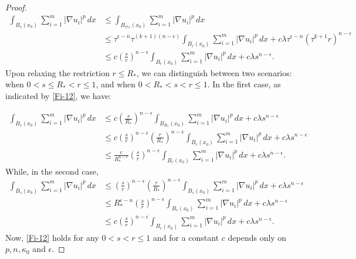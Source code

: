 \documentclass{amsart}
\begin{document}
\begin{proof}
\begin{align} \nonumber
\int_{B_s(x_0)} \sum_{i=1}^{m} |\nabla u_i|^p \, dx  & \leq \int_{B_{\tau^k r}(x_0)} \sum_{i=1}^{m} |\nabla u_i|^p \, dx \\ \nonumber
& \leq \tau^{\epsilon-n} \tau^{(k+1)(n-\epsilon)} \int_{B_{r}(x_0)} \sum_{i=1}^{m} |\nabla u_i|^p \, dx + c \lambda \tau^{\epsilon-n} \left(\tau^{k+1} r \right)^{n-\epsilon} \\ \label{Fi-12}
& \leq c \left( \frac{s}{r} \right)^{n-\epsilon} \int_{B_{r}(x_0)} \sum_{i=1}^{m} |\nabla u_i|^p \, dx + c \lambda s^{n-\epsilon}.
\end{align}
Upon relaxing the restriction $r \leq R_*$, we can distinguish between two scenarios: 
when $0 < s \leq R_* < r \leq 1$, and when 
$0 < R_* < s < r \leq 1$. In the first case, as indicated by \eqref{Fi-12}, we have:


$$
\begin{aligned}
\int_{B_s(x_0)} \sum_{i=1}^{m} |\nabla u_i|^p \, dx & \leq c \left( \frac{s}{R_*} \right)^{n-\epsilon} \int_{B_{R_*}(x_0)} \sum_{i=1}^{m} |\nabla u_i|^p \, dx + c \lambda s^{n-\epsilon} 
\\ & \leq c \left( \frac{s}{r} \right)^{n-\epsilon} \left( \frac{r}{R_*}\right)^{n-\epsilon} \int_{B_{r}(x_0)} \sum_{i=1}^{m} |\nabla u_i|^p \, dx + c \lambda s^{n-\epsilon}
\\& \leq \frac{c}{R_*^{n-\epsilon}} \left( \frac{s}{r} \right)^{n-\epsilon} \int_{B_{r}(x_0)} \sum_{i=1}^{m}
|\nabla u_i|^p \, dx +c \lambda s^{n-\epsilon}.
\end{aligned}
$$
While, in the second case, 
$$
\begin{aligned}
\int_{B_s(x_0)} \sum_{i=1}^{m} |\nabla u_i|^p \, dx & \leq  \left( \frac{s}{r} \right)^{n-\epsilon} \left( \frac{r}{R_*} \right)^{n-\epsilon} \int_{B_{s}(x_0)} \sum_{i=1}^{m} |\nabla u_i|^p \, dx + c \lambda s^{n-\epsilon}\\ 
& \leq  R_*^{\epsilon-n} \left( \frac{s}{r} \right)^{n-\epsilon} \int_{B_{r}(x_0)} \sum_{i=1}^{m} |\nabla u_i|^p \, dx + c \lambda s^{n-\epsilon} \\
& \leq c \left( \frac{s}{r} \right)^{n-\epsilon} \int_{B_{r}(x_0)} \sum_{i=1}^{m}
|\nabla u_i|^p \, dx + c \lambda s^{n-\epsilon}.
\end{aligned}
$$
Now,
\eqref{Fi-12} holds for any $0<s<r \leq 1$ and for a constant $c$ depends only on $p, n, \kappa_0$ and $\epsilon$. 


\end{proof}
\end{document}
